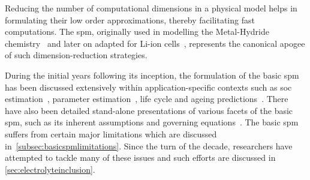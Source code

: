 


Reducing  the   number  of   computational  dimensions   in  a   physical  model
helps  in  formulating  their  low order  approximations,  thereby  facilitating
fast   computations.   The  \gls{spm},   originally   used   in  modelling   the
Metal-Hydride    chemistry~\cite{Haran1998}   and    later   on    adapted   for
Li-ion   cells~\cite{Ning2004},  represents   the  canonical   apogee  of   such
dimension-reduction strategies.


During the initial  years following its inception, the formulation  of the basic
\gls{spm} has  been discussed  extensively within  application-specific contexts
such  as  \gls{soc}  estimation~\cite{Santhanagopalan2006a,Santhanagopalan2008},
parameter   estimation~\cite{Santhanagopalan2007},   life   cycle   and   ageing
predictions~\cite{Santhanagopalan2008a,Safari2009}.   There   have   also   been
detailed    stand-alone    presentations    of    various    facets    of    the
basic   \gls{spm},   such   as    its   inherent   assumptions   and   governing
equations~\cite{Santhanagopalan2006,Chaturvedi2010}.    The   basic    \gls{spm}
suffers    from    certain    major     limitations    which    are    discussed
in~\cref{subsec:basicspmlimitations}. Since the turn  of the decade, researchers
have attempted to tackle many of these  issues and such efforts are discussed in
\cref{sec:electrolyteinclusion}.


